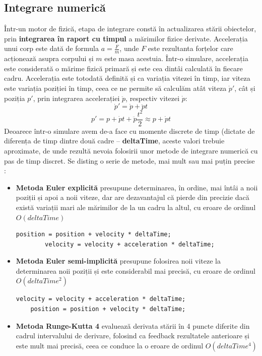 \documentclass[12pt,a4paper]{report}
\begin{document}
\subsection{Integrare numerică}
Într-un motor de fizică, etapa de integrare constă în actualizarea stării obiectelor, prin \textbf{integrarea în raport cu timpul} a mărimilor fizice derivate. Accelerația unui corp este dată de formula $ a = \frac{F}{m} $, unde $F$ este rezultanta forțelor care acționează asupra corpului și $m$ este masa acestuia. Într-o simulare, accelerația este considerată o mărime fizică primară și este cea dintâi calculată în fiecare cadru. Accelerația este totodată definită și ca variația vitezei în timp, iar viteza este variația poziției în timp, ceea ce ne permite să calculăm atât viteza $\dot{p}'$, cât și poziția $p'$, prin integrarea accelerației $\ddot{p}$, respectiv vitezei $\dot{p}$:
$$ \dot{p}' = \dot{p} + \ddot{p}t $$
$$ p' = p + \dot{p}t + \ddot{p}\frac{t^2}{2} \approx p + \dot{p}t $$
Deoarece într-o simulare avem de-a face cu momente discrete de timp (dictate de diferența de timp dintre două cadre -- \textbf{deltaTime}, aceste valori trebuie aproximate, de unde rezultă nevoia folosirii unor metode de integrare numerică cu pas de timp discret.
Se disting o serie de metode, mai mult sau mai puțin precise \cite{integration_gaffer}:
\begin{itemize}
	\item \textbf{Metoda Euler explicită}\cite{explicit_euler} presupune determinarea, în ordine, mai întâi a noii poziții și apoi a noii viteze, dar are dezavantajul că pierde din precizie dacă există variații mari ale mărimilor de la un cadru la altul, cu eroare de ordinul $O(deltaTime)$
	\begin{lstlisting}[style=myC++]
		position = position + velocity * deltaTime;
		velocity = velocity + acceleration * deltaTime;
	\end{lstlisting}
	\item \textbf{Metoda Euler semi-implicită}\cite{implicit_euler}\label{inline_implicit_euler} presupune folosirea noii viteze la determinarea noii poziții și este considerabil mai precisă, cu eroare de ordinul $O(deltaTime^2)$
	\begin{lstlisting}[style=myC++]
	velocity = velocity + acceleration * deltaTime;
	position = position + velocity * deltaTime;
	\end{lstlisting}
	\item \textbf{Metoda Runge-Kutta 4}\cite{runge_kutta} evaluează derivata stării în 4 puncte diferite din cadrul intervalului de derivare, folosind ca feedback rezultatele anterioare și este mult mai precisă, ceea ce conduce la o eroare de ordinul $O(deltaTime^4)$
\end{itemize}
\end{document}
